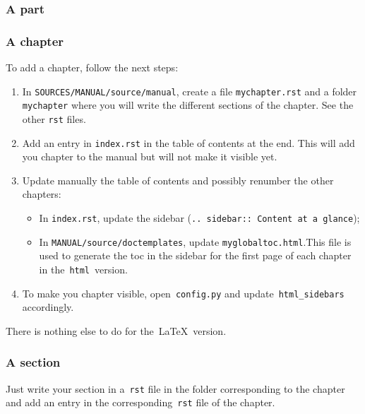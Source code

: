 \documentclass[a4paper,10pt]{article}
\newcommand{\code}[1]{\texttt{#1}}
\begin{document}
\subsubsection{A part}


\subsubsection{A chapter}

To add a chapter, follow the next steps:
\begin{enumerate}
 \item In \code{SOURCES/MANUAL/source/manual}, create a file \code{mychapter.rst} and a folder \code{mychapter} where you will write the different sections of the chapter. See the other \code{rst} files.
 \item Add an entry in \code{index.rst} in the table of contents at the end. This will add you chapter to the manual but will not make it visible yet.
 \item Update manually the table of contents and possibly renumber the other chapters:
       \begin{itemize}
        \item In \code{index.rst}, update the sidebar (\code{.. sidebar:: Content at a glance});
        \item In \code{MANUAL/source/doctemplates}, update \code{myglobaltoc.html}.This file is used to generate the toc in the sidebar for the first page of each chapter in the~\code{html}~version.
       \end{itemize}
 \item To make you chapter visible, open~\code{config.py} and update~\code{html\_sidebars} accordingly.
\end{enumerate}

There is nothing else to do for the~\LaTeX\ version.

\subsubsection{A section}

Just write your section in a~\code{rst} file in the folder corresponding to the chapter and add an entry in the corresponding~\code{rst} file of the chapter.
\end{document}
